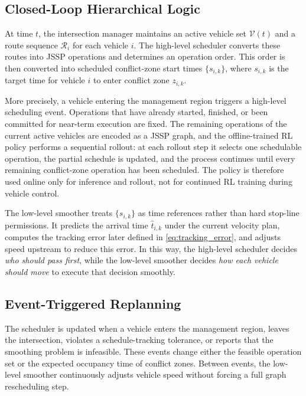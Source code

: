 \subsection{Closed-Loop Hierarchical Logic}
At time $t$, the intersection manager maintains an active vehicle set $\mathcal{V}(t)$ and a route sequence $\mathcal{R}_i$ for each vehicle $i$. The high-level scheduler converts these routes into JSSP operations and determines an operation order. This order is then converted into scheduled conflict-zone start times $\{s_{i,k}\}$, where $s_{i,k}$ is the target time for vehicle $i$ to enter conflict zone $z_{i,k}$.

\begin{addedblock}
More precisely, a vehicle entering the management region triggers a high-level scheduling event. Operations that have already started, finished, or been committed for near-term execution are fixed. The remaining operations of the current active vehicles are encoded as a JSSP graph, and the offline-trained RL policy performs a sequential rollout: at each rollout step it selects one schedulable operation, the partial schedule is updated, and the process continues until every remaining conflict-zone operation has been scheduled. The policy is therefore used online only for inference and rollout, not for continued RL training during vehicle control.
\end{addedblock}

The low-level smoother treats $\{s_{i,k}\}$ as time references rather than hard stop-line permissions. It predicts the arrival time $\hat{t}_{i,k}$ under the current velocity plan, computes the tracking error later defined in \eqref{eq:tracking_error}, and adjusts speed upstream to reduce this error. In this way, the high-level scheduler decides \emph{who should pass first}, while the low-level smoother decides \emph{how each vehicle should move} to execute that decision smoothly.

\subsection{Event-Triggered Replanning}
The scheduler is updated when a vehicle enters the management region, leaves the intersection, violates a schedule-tracking tolerance, or reports that the smoothing problem is infeasible. These events change either the feasible operation set or the expected occupancy time of conflict zones. Between events, the low-level smoother continuously adjusts vehicle speed without forcing a full graph rescheduling step.


